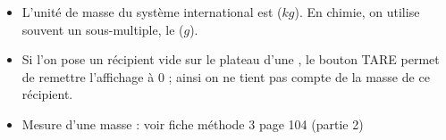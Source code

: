 \begin{mybilan}
	\begin{itemize}
		\item L'unité de masse du système international est  ($kg$). En chimie, on utilise souvent un sous-multiple, le  ($g$).\pause
		\item Si l'on pose un récipient vide sur le plateau d'une , le bouton TARE permet de remettre l'affichage à 0 ; ainsi on ne tient pas compte de la masse de ce récipient.\pause
		\item Mesure d'une masse : voir fiche méthode 3 page 104 (partie 2)
	\end{itemize}
\end{mybilan}